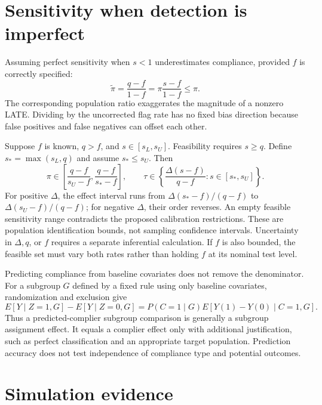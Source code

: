 \documentclass[11pt]{article}
\begin{document}
\section{Sensitivity when detection is imperfect}

Assuming perfect sensitivity when $s<1$ underestimates compliance, provided $f$ is correctly specified:
\begin{equation}
\widetilde\pi=\frac{q-f}{1-f}=\pi\frac{s-f}{1-f}\leq\pi.
\end{equation}
The corresponding population ratio exaggerates the magnitude of a nonzero LATE. Dividing by the uncorrected flag rate has no fixed bias direction because false positives and false negatives can offset each other.

Suppose $f$ is known, $q>f$, and $s\in[s_L,s_U]$. Feasibility requires $s\geq q$. Define $s_*=\max(s_L,q)$ and assume $s_*\leq s_U$. Then
\begin{equation}\label{eq:bounds}
\pi\in\left[\frac{q-f}{s_U-f},\frac{q-f}{s_*-f}\right],\qquad
\tau\in\left\{\frac{\Delta(s-f)}{q-f}:s\in[s_*,s_U]\right\}.
\end{equation}
For positive $\Delta$, the effect interval runs from $\Delta(s_*-f)/(q-f)$ to $\Delta(s_U-f)/(q-f)$; for negative $\Delta$, their order reverses. An empty feasible sensitivity range contradicts the proposed calibration restrictions. These are population identification bounds, not sampling confidence intervals. Uncertainty in $\Delta,q$, or $f$ requires a separate inferential calculation. If $f$ is also bounded, the feasible set must vary both rates rather than holding $f$ at its nominal test level.

Predicting compliance from baseline covariates does not remove the denominator. For a subgroup $G$ defined by a fixed rule using only baseline covariates, randomization and exclusion give
\begin{equation}
E[Y\mid Z=1,G]-E[Y\mid Z=0,G]
=P(C=1\mid G)E[Y(1)-Y(0)\mid C=1,G].
\end{equation}
Thus a predicted-complier subgroup comparison is generally a subgroup assignment effect. It equals a complier effect only with additional justification, such as perfect classification and an appropriate target population. Prediction accuracy does not test independence of compliance type and potential outcomes.

\section{Simulation evidence}\label{sec:simulation}
\end{document}
